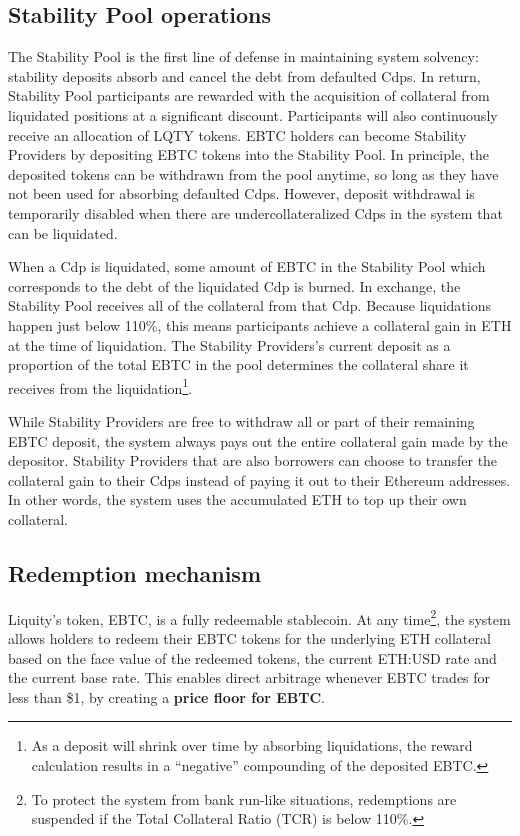 \documentclass{article}
\begin{document}
\subsection{Stability Pool operations}
The Stability Pool is the first line of defense in maintaining system solvency: stability deposits absorb and cancel the debt from defaulted Cdps. In return, Stability Pool participants are rewarded with the acquisition of collateral from liquidated positions at a significant discount. Participants will also continuously receive an allocation of LQTY tokens.
EBTC holders can become Stability Providers by depositing EBTC tokens into the Stability Pool. In principle, the deposited tokens can be withdrawn from the pool anytime, so long as they have not been used for absorbing defaulted Cdps. However, deposit withdrawal is temporarily disabled when there are undercollateralized Cdps in the system that can be liquidated.

When a Cdp is liquidated, some amount of EBTC in the Stability Pool which corresponds to the debt of the liquidated Cdp is burned. In exchange, the Stability Pool receives all of the collateral from that Cdp. Because liquidations happen just below 110\%, this means participants achieve a collateral gain in ETH at the time of liquidation. The Stability Providers’s current deposit as a proportion of the total EBTC in the pool determines the collateral share it receives from the liquidation\footnote{As a deposit will shrink over time by absorbing liquidations, the reward calculation results in a “negative” compounding of the deposited EBTC.}. 

While Stability Providers are free to withdraw all or part of their remaining EBTC deposit, the system always pays out the entire collateral gain made by the depositor. Stability Providers that are also borrowers can choose to transfer the collateral gain to their Cdps instead of paying it out to their Ethereum addresses. In other words, the system uses the accumulated ETH to top up their own collateral. 

\subsection{Redemption mechanism}
Liquity’s token, EBTC, is a fully redeemable stablecoin. At any time\footnote{To protect the system from bank run-like situations, redemptions are suspended if the Total Collateral Ratio (TCR) is below 110\%.}, the system allows holders to redeem their EBTC tokens for the underlying ETH collateral based on the face value of the redeemed tokens, the current ETH:USD rate and the current base rate. This enables direct arbitrage whenever EBTC trades for less than \$1, by creating a \textbf{price floor for EBTC}.\\
\end{document}
